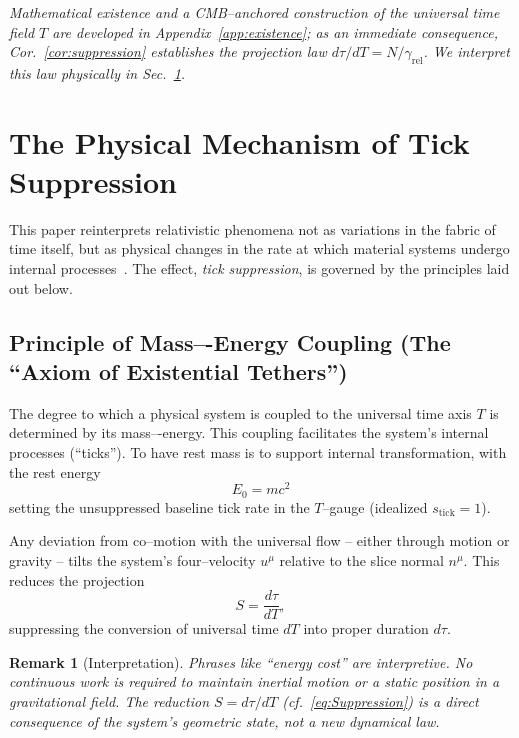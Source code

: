 \documentclass[12pt]{article}
\theoremstyle{plain}
\newtheorem{remark}{Remark}
\begin{document}
\medskip
\noindent
\emph{Mathematical existence and a CMB–anchored construction of the universal time field $T$ are developed in Appendix~\ref{app:existence}; as an immediate consequence, Cor.~\ref{cor:suppression} establishes the projection law $d\tau/dT = N/\gamma_{\mathrm{rel}}$. We interpret this law physically in Sec.~\ref{sec:mechanism}.}


\section{The Physical Mechanism of Tick Suppression}
\label{sec:mechanism}
This paper reinterprets relativistic phenomena not as variations in the fabric of time itself, but as physical changes in the rate at which material systems undergo internal processes~\cite{Einstein1905,Minkowski1908}. The effect, \emph{tick suppression}, is governed by the principles laid out below.

\subsection{Principle of Mass–-Energy Coupling (The ``Axiom of Existential Tethers'')}
The degree to which a physical system is coupled to the universal time axis $T$ is determined by its mass–-energy. This coupling facilitates the system's internal processes (``ticks''). To have rest mass is to support internal transformation, with the rest energy
\begin{equation}
E_0 = mc^2
\label{eq:RestEnergy}
\end{equation}
setting the unsuppressed baseline tick rate in the $T$–gauge (idealized $s_{\text{tick}}=1$).  

\medskip
\noindent
Any deviation from co–motion with the universal flow – either through motion or gravity – tilts the system’s four–velocity $u^\mu$ relative to the slice normal $n^\mu$. This reduces the projection
\begin{equation}
S=\frac{d\tau}{dT},
\label{eq:Projection}
\end{equation}
suppressing the conversion of universal time $dT$ into proper duration $d\tau$.  

\begin{remark}[Interpretation]
Phrases like “energy cost” are interpretive. No continuous work is required to maintain inertial motion or a static position in a gravitational field. The reduction $S=d\tau/dT$ (cf.~\eqref{eq:Suppression}) is a direct consequence of the system’s geometric state, not a new dynamical law.
\end{remark}
\end{document}
